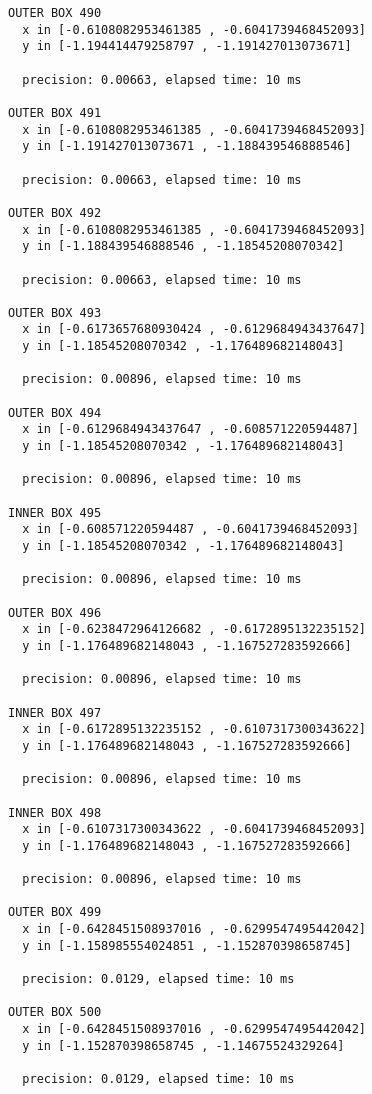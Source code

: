 \begin{verbatim}
OUTER BOX 490
  x in [-0.6108082953461385 , -0.6041739468452093]
  y in [-1.194414479258797 , -1.191427013073671]

  precision: 0.00663, elapsed time: 10 ms

OUTER BOX 491
  x in [-0.6108082953461385 , -0.6041739468452093]
  y in [-1.191427013073671 , -1.188439546888546]

  precision: 0.00663, elapsed time: 10 ms

OUTER BOX 492
  x in [-0.6108082953461385 , -0.6041739468452093]
  y in [-1.188439546888546 , -1.18545208070342]

  precision: 0.00663, elapsed time: 10 ms

OUTER BOX 493
  x in [-0.6173657680930424 , -0.6129684943437647]
  y in [-1.18545208070342 , -1.176489682148043]

  precision: 0.00896, elapsed time: 10 ms

OUTER BOX 494
  x in [-0.6129684943437647 , -0.608571220594487]
  y in [-1.18545208070342 , -1.176489682148043]

  precision: 0.00896, elapsed time: 10 ms

INNER BOX 495
  x in [-0.608571220594487 , -0.6041739468452093]
  y in [-1.18545208070342 , -1.176489682148043]

  precision: 0.00896, elapsed time: 10 ms

OUTER BOX 496
  x in [-0.6238472964126682 , -0.6172895132235152]
  y in [-1.176489682148043 , -1.167527283592666]

  precision: 0.00896, elapsed time: 10 ms

INNER BOX 497
  x in [-0.6172895132235152 , -0.6107317300343622]
  y in [-1.176489682148043 , -1.167527283592666]

  precision: 0.00896, elapsed time: 10 ms

INNER BOX 498
  x in [-0.6107317300343622 , -0.6041739468452093]
  y in [-1.176489682148043 , -1.167527283592666]

  precision: 0.00896, elapsed time: 10 ms

OUTER BOX 499
  x in [-0.6428451508937016 , -0.6299547495442042]
  y in [-1.158985554024851 , -1.152870398658745]

  precision: 0.0129, elapsed time: 10 ms

OUTER BOX 500
  x in [-0.6428451508937016 , -0.6299547495442042]
  y in [-1.152870398658745 , -1.14675524329264]

  precision: 0.0129, elapsed time: 10 ms


\end{verbatim}
